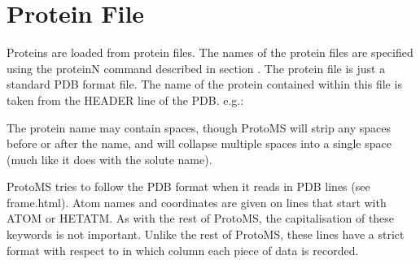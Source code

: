 \documentclass[letterpaper,10pt,english]{sphinxmanual}
\begin{document}
\section{Protein File}
\label{\detokenize{protoms:protein-file}}\label{\detokenize{protoms:protpdb}}
Proteins are loaded from protein files. The names of the protein files are specified using the proteinN command described in section {\hyperref[\detokenize{protoms:incmd}]{}}. The protein file is just a standard PDB format file. The name of the protein contained within this file is taken from the HEADER line of the PDB. e.g.:

%
\begin{sphinxVerbatim}[commandchars=\\\{\}]
  
\end{sphinxVerbatim}

The protein name may contain spaces, though ProtoMS will strip any spaces before or after the name, and will collapse multiple spaces into a single space (much like it does with the solute name).

ProtoMS tries to follow the PDB format when it reads in PDB lines (see  frame.html). Atom names and coordinates are given on lines that start with ATOM or HETATM. As with the rest of ProtoMS, the capitalisation of these keywords is not important. Unlike the rest of ProtoMS, these lines have a strict format with respect to in which column each piece of data is recorded.
\end{document}
